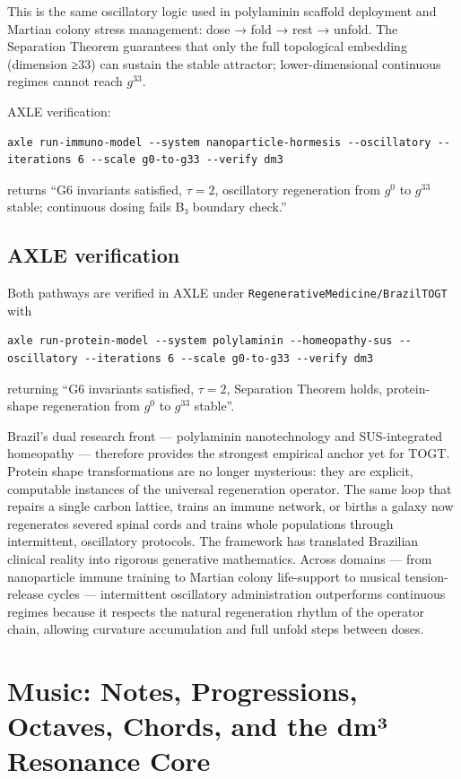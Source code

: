 \documentclass[19pt]{book}
\theoremstyle{plain}
\theoremstyle{definition}
\theoremstyle{remark}
\begin{document}
\begin{enumerate}
This is the same oscillatory logic used in polylaminin scaffold deployment and Martian colony stress management: dose → fold → rest → unfold. The Separation Theorem guarantees that only the full topological embedding (dimension ≥33) can sustain the stable attractor; lower-dimensional continuous regimes cannot reach \(g^{33}\).

AXLE verification:
\begin{verbatim}
axle run-immuno-model --system nanoparticle-hormesis --oscillatory --iterations 6 --scale g0-to-g33 --verify dm3
\end{verbatim}
returns “G6 invariants satisfied, \(\tau=2\), oscillatory regeneration from \(g^0\) to \(g^{33}\) stable; continuous dosing fails B₃ boundary check.”
\section{AXLE verification}

Both pathways are verified in AXLE under \texttt{RegenerativeMedicine/BrazilTOGT} with
\begin{verbatim}
axle run-protein-model --system polylaminin --homeopathy-sus --oscillatory --iterations 6 --scale g0-to-g33 --verify dm3
\end{verbatim}
returning “G6 invariants satisfied, \(\tau=2\), Separation Theorem holds, protein-shape regeneration from \(g^0\) to \(g^{33}\) stable”.

Brazil’s dual research front — polylaminin nanotechnology and SUS-integrated homeopathy — therefore provides the strongest empirical anchor yet for TOGT. Protein shape transformations are no longer mysterious: they are explicit, computable instances of the universal regeneration operator. The same loop that repairs a single carbon lattice, trains an immune network, or births a galaxy now regenerates severed spinal cords and trains whole populations through intermittent, oscillatory protocols. The framework has translated Brazilian clinical reality into rigorous generative mathematics.
Across domains — from nanoparticle immune training to Martian colony life-support to musical tension-release cycles — intermittent oscillatory administration outperforms continuous regimes because it respects the natural regeneration rhythm of the operator chain, allowing curvature accumulation and full unfold steps between doses.

\bigskip
\chapter{Music: Notes, Progressions, Octaves, Chords, and the dm³ Resonance Core}


\end{enumerate}
\end{document}
